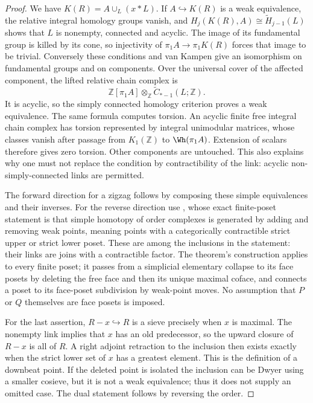 \begin{proof}
We have $K(R)=A\cup_L(x*L)$. If $A\hookrightarrow K(R)$ is a weak
equivalence, the relative integral homology groups vanish, and
$H_j(K(R),A)\cong\widetilde H_{j-1}(L)$ shows that $L$ is nonempty,
connected and acyclic. The image of its fundamental group is killed
by its cone, so injectivity of $\pi_1A\to\pi_1K(R)$ forces that
image to be trivial. Conversely these conditions and van Kampen give
an isomorphism on fundamental groups and on components. Over the
universal cover of the affected component, the lifted relative chain
complex is
\[
 \mathbb Z[\pi_1A]\otimes_{\mathbb Z}
 \widetilde C_{*-1}(L;\mathbb Z).
\]
It is acyclic, so the simply connected homology criterion proves a
weak equivalence. The same formula computes torsion. An acyclic finite
free integral chain complex has torsion represented by integral
unimodular matrices, whose classes vanish after passage from
$K_1(\mathbb Z)$ to $\Wh(\pi_1A)$. Extension of scalars therefore gives
zero torsion. Other components are untouched. This also explains why
one must not replace the condition by contractibility of the link:
acyclic non-simply-connected links are permitted.

The forward direction for a zigzag follows by composing these simple
equivalences and their inverses. For the reverse direction use
\cite[Theorem~3.10(a)]{I_BarmakMinian2008}, whose exact finite-poset
statement is that simple homotopy of order complexes is generated by
adding and removing weak points, meaning points with a categorically
contractible strict upper or strict lower poset. These are among the
inclusions in the statement: their links are joins with a contractible
factor. The theorem's construction applies to every finite poset;
it passes from a simplicial elementary collapse to its face posets
by deleting the free face and then its unique maximal coface, and
connects a poset to its face-poset subdivision by weak-point moves.
No assumption that $P$ or $Q$ themselves are face posets is imposed.

For the last assertion, $R-x\hookrightarrow R$ is a sieve precisely
when $x$ is maximal. The nonempty link implies that $x$ has an old
predecessor, so the upward closure of $R-x$ is all of $R$. A right
adjoint retraction to the inclusion then exists exactly when the
strict lower set of $x$ has a greatest element. This is the definition
of a downbeat point. If the deleted point is isolated the inclusion
can be Dwyer using a smaller cosieve, but it is not a weak equivalence;
thus it does not supply an omitted case. The dual statement follows
by reversing the order.
\end{proof}

